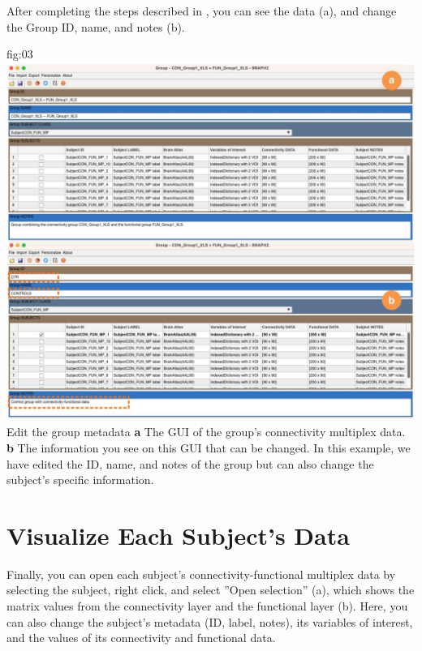 \documentclass[justified]{tufte-handout}
\begin{document}
After completing the steps described in , you can see the data (a), and change the Group ID, name, and notes (b). 

	{fig:03}
	{
	\includegraphics{fig03.jpg}
	}
	{Edit the group metadata}
	{ 
	{\bf a} The GUI of the group's connectivity multiplex data. 
	{\bf b} The information you see on this GUI that can be changed. In this example, we have edited the ID, name, and notes of the group but can also change the subject's specific information.
	}


\section{Visualize Each Subject's Data}

Finally, you can open each subject's connectivity-functional multiplex data by selecting the subject, right click, and select ''Open selection'' (a), which shows the matrix values from the connectivity layer and the functional layer (b). Here, you can also change the subject's metadata (ID, label, notes), its variables of interest, and the values of its connectivity and functional data.
\end{document}
